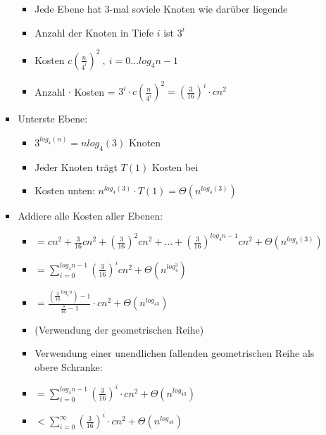 \begin{itemize}
\begin{itemize}
\begin{itemize}
\begin{itemize}
                                \item Jede Ebene hat 3-mal soviele Knoten wie darüber liegende
                                \item Anzahl der Knoten in Tiefe $i$ ist $3^i$
                                \item Kosten $c(\frac{n}{4^i})^2~,~i=0...log_4n-1$
                                \item Anzahl $\cdot$ Kosten = $3^i \cdot c(\frac{n}{4^i})^2 = (\frac{3}{16})^i \cdot cn^2$
                            \end{itemize}
                        \item Unterste Ebene:
                            \begin{itemize}
                                \item $3^{log_4(n)} = n  {log_4(3)}$ Knoten
                                \item Jeder Knoten trägt $T(1)$ Kosten bei 
                                \item Kosten unten: $n^{log_4(3)} \cdot T(1) = \Theta(n^{log_4(3)})$
                            \end{itemize}
                        \item Addiere alle Kosten aller Ebenen:
                            \begin{itemize}
                                \item {} $= cn^2 + \frac{3}{16}cn^2 + (\frac{3}{16})^2cn^2+...+ (\frac{3}{16})^{log_4n-1}cn^2 + \Theta(n^{log_4(3)})$
                                \item[] {\makebox[0.75cm][l]{}} $= \sum^{log_4n-1}_{i=0} (\frac{3}{16})^icn^2+ \Theta(n^{log_4^3})$
                                \item[] {\makebox[0.75cm][l]{}} $= \frac{(\frac{3}{16}^{log_4n})-1}{\frac{3}{16}-1} \cdot cn^2 + \Theta(n^{log_43})$ 
                                \item[] {\small (Verwendung der geometrischen Reihe)}
                                \item Verwendung einer unendlichen fallenden geometrischen Reihe als obere Schranke:
                                \item[] {}  $= \sum^{log_4n-1}_{i=0} (\frac{3}{16})^i \cdot cn^2 + \Theta(n^{log_43})$
                                \item[] {\makebox[0.73cm][l]{}} $< \sum^{\infty}_{i=0} (\frac{3}{16})^i \cdot cn^2 + \Theta(n^{log_43})$

\end{itemize}
\end{itemize}
\end{itemize}
\end{itemize}
